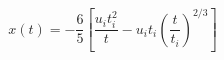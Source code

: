 \begin{equation}
\label{comoving}
x(t) = - \frac{6}{5} \left[ \frac{u_i t_i^2}{t} - u_i t_i \left(\frac{t}{t_i}\right)^{2/3}\right]
\end{equation}

